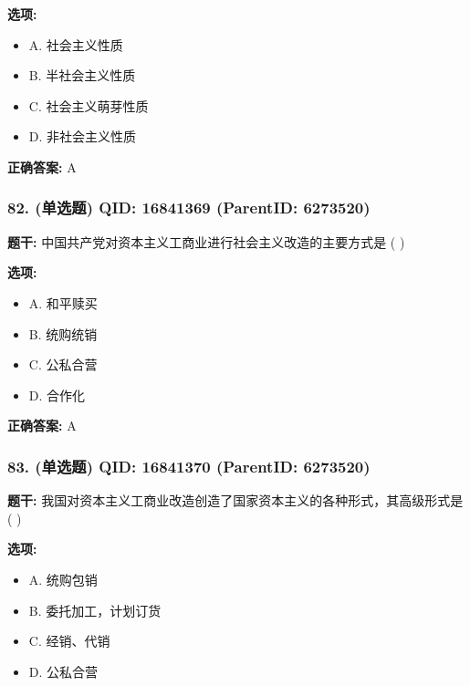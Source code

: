 \documentclass[12pt,UTF8]{ctexart}
\begin{document}
\textbf{选项:}
\begin{itemize}[leftmargin=*]

  \item A. 社会主义性质

  \item B. 半社会主义性质

  \item C. 社会主义萌芽性质

  \item D. 非社会主义性质

\end{itemize}

\textbf{正确答案:}
A

\vspace{0.3em}\hrulefill\vspace{0.7em}

\subsubsection*{82. (单选题) \small QID: 16841369 (ParentID: 6273520)}

\textbf{题干:}
中国共产党对资本主义工商业进行社会主义改造的主要方式是 ( )



\textbf{选项:}
\begin{itemize}[leftmargin=*]

  \item A. 和平赎买

  \item B. 统购统销

  \item C. 公私合营

  \item D. 合作化

\end{itemize}

\textbf{正确答案:}
A

\vspace{0.3em}\hrulefill\vspace{0.7em}

\subsubsection*{83. (单选题) \small QID: 16841370 (ParentID: 6273520)}

\textbf{题干:}
我国对资本主义工商业改造创造了国家资本主义的各种形式，其高级形式是 ( )



\textbf{选项:}
\begin{itemize}[leftmargin=*]

  \item A. 统购包销

  \item B. 委托加工，计划订货

  \item C. 经销、代销

  \item D. 公私合营

\end{itemize}
\end{document}
